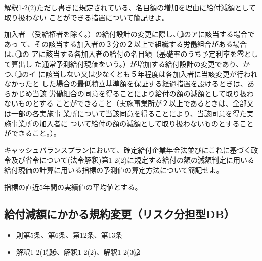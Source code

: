 \begin{shortanswer}
  解釈1-2(2)ただし書きに規定されている、名目額の増加を理由に給付減額として取り扱わない
  ことができる措置について簡記せよ。
\end{shortanswer}

\begin{answerbox}
  加入者
（受給権者を除く。）の給付設計の変更に際し、\textcircled{1}のアに該当する場合であっ
て、その該当する加入者の３分の２以上で組織する労働組合がある場合は、\textcircled{1}の
アに該当する各加入者の給付の名目額（基礎率のうち予定利率を零として算出し
た通常予測給付現価をいう。）が増加する給付設計の変更であり、かつ、\textcircled{1}のイ
に該当しない又は少なくとも５年程度は各加入者に当該変更が行われなかったと
した場合の最低積立基準額を保証する経過措置を設けるときは、あらかじめ当該
労働組合の同意を得ることにより給付の額の減額として取り扱わないものとする
ことができること（実施事業所が２以上であるときは、全部又は一部の各実施事
業所について当該同意を得ることにより、当該同意を得た実施事業所の加入者に
ついて給付の額の減額として取り扱わないものとすることができること。）。
\end{answerbox}

\begin{shortanswer}[年金1 \ H23 \ 問題2(4)\textcircled{2}（改題）]
  キャッシュバランスプランにおいて、確定給付企業年金法並びにこれに基づく政令及び省令について(法令解釈)第1-2(2)に規定する給付の額の減額判定に用いる給付現価の計算に用いる指標の予測値の算定方法について簡記せよ。
\end{shortanswer}

\begin{answerbox}
  指標の直近5年間の実績値の平均値とする。
\end{answerbox}

\newpage

\subsection{給付減額にかかる規約変更（リスク分担型DB）}

\begin{InyouJobunbox}
  \begin{itemize}
    \item 則第5条、第6条、第12条、第13条
    \item 解釈1-2(1)\textcircled{3}\textcircled{6}、解釈1-2(2)、解釈1-2(3)\textcircled{2}
  \end{itemize}
\end{InyouJobunbox}

